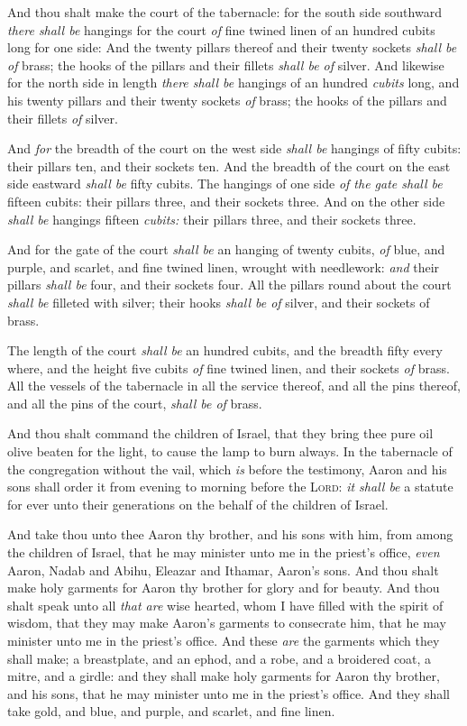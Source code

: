 \documentclass[11pt,letterpaper,oneside]{memoir}
\begin{document}
And thou shalt make the court of the tabernacle: for the south side
southward \emph{there shall be} hangings for the court \emph{of} fine
twined linen of an hundred cubits long for one side: And the twenty
pillars thereof and their twenty sockets \emph{shall be of} brass; the
hooks of the pillars and their fillets \emph{shall be of} silver. And
likewise for the north side in length \emph{there shall be} hangings of
an hundred \emph{cubits} long, and his twenty pillars and their twenty
sockets \emph{of} brass; the hooks of the pillars and their fillets
\emph{of} silver.

And \emph{for} the breadth of the court on the west side \emph{shall be}
hangings of fifty cubits: their pillars ten, and their sockets ten. And
the breadth of the court on the east side eastward \emph{shall be} fifty
cubits. The hangings of one side \emph{of the gate shall be} fifteen cubits:
their pillars three, and their sockets three. And on the other side
\emph{shall be} hangings fifteen \emph{cubits:} their pillars three, and
their sockets three.

And for the gate of the court \emph{shall be} an hanging of twenty
cubits, \emph{of} blue, and purple, and scarlet, and fine twined linen,
wrought with needlework: \emph{and} their pillars \emph{shall be} four,
and their sockets four. All the pillars round about the court
\emph{shall be} filleted with silver; their hooks \emph{shall be of}
silver, and their sockets of brass.

The length of the court \emph{shall be} an hundred cubits, and the
breadth fifty every where, and the height five cubits \emph{of} fine
twined linen, and their sockets \emph{of} brass. All the vessels of the
tabernacle in all the service thereof, and all the pins thereof, and all
the pins of the court, \emph{shall be of} brass.

And thou shalt command the children of Israel, that they bring thee pure
oil olive beaten for the light, to cause the lamp to burn always. In the
tabernacle of the congregation without the vail, which \emph{is} before
the testimony, Aaron and his sons shall order it from evening to morning
before the \textsc{Lord}: \emph{it shall be} a statute for ever unto
their generations on the behalf of the children of Israel.

And take thou unto thee Aaron thy brother, and his sons with him, from
among the children of Israel, that he may minister unto me in the
priest's office, \emph{even} Aaron, Nadab and Abihu, Eleazar and
Ithamar, Aaron's sons. And thou shalt make holy garments for Aaron thy
brother for glory and for beauty. And thou shalt speak unto all
\emph{that are} wise hearted, whom I have filled with the spirit of
wisdom, that they may make Aaron's garments to consecrate him, that he
may minister unto me in the priest's office. And these \emph{are} the
garments which they shall make; a breastplate, and an ephod, and a robe,
and a broidered coat, a mitre, and a girdle: and they shall make holy
garments for Aaron thy brother, and his sons, that he may minister unto
me in the priest's office. And they shall take gold, and blue, and
purple, and scarlet, and fine linen.
\end{document}
